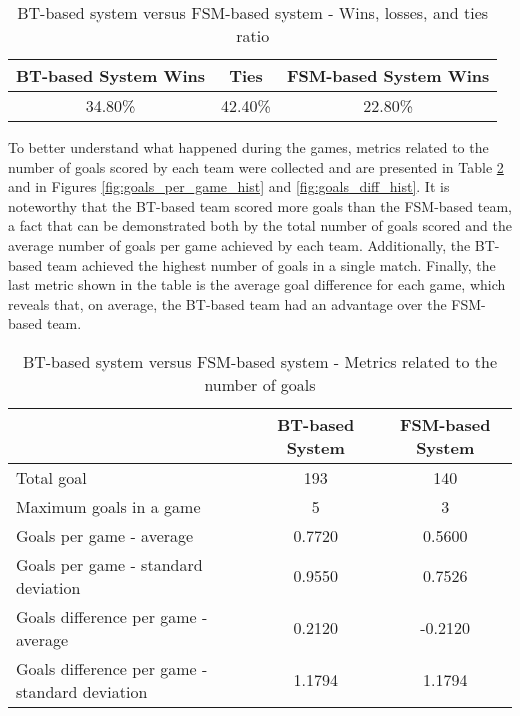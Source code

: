 \begin{table}[h]
    \centering
    \begin{tabular}{c c c}
        \toprule
        BT-based System Wins & Ties    & FSM-based System Wins \\
        \midrule
        34.80\%              & 42.40\% & 22.80\%               \\
        \bottomrule
    \end{tabular}
    \caption{BT-based system versus FSM-based system - Wins, losses, and ties ratio}
    \label{tab:wins}
\end{table}

To better understand what happened during the games, metrics related to the number of goals scored by each team were collected and are presented in Table \ref{tab:goals_number_metrics} and in Figures \ref{fig:goals_per_game_hist} and \ref{fig:goals_diff_hist}. It is noteworthy that the BT-based team scored more goals than the FSM-based team, a fact that can be demonstrated both by the total number of goals scored and the average number of goals per game achieved by each team. Additionally, the BT-based team achieved the highest number of goals in a single match. Finally, the last metric shown in the table is the average goal difference for each game, which reveals that, on average, the BT-based team had an advantage over the FSM-based team.

\begin{table}[h]
    \centering
    \begin{tabular}{l c c}
        \toprule
                                                       & BT-based System & FSM-based System \\
        \midrule
        Total goal                                     & 193             & 140              \\
        Maximum goals in a game                        & 5               & 3                \\
        Goals per game - average                       & 0.7720          & 0.5600           \\
        Goals per game - standard deviation            & 0.9550          & 0.7526           \\
        Goals difference per game - average            & 0.2120          & -0.2120          \\
        Goals difference per game - standard deviation & 1.1794          & 1.1794           \\
        \bottomrule
    \end{tabular}
    \caption{BT-based system versus FSM-based system - Metrics related to the number of goals}
    \label{tab:goals_number_metrics}
\end{table}

